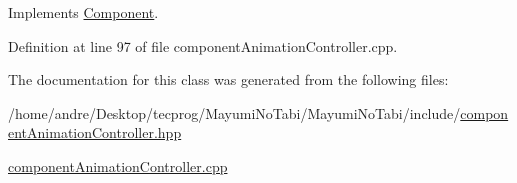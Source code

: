 Implements \hyperlink{class_component_a20c791684d452b36fcce40ac9038c735}{Component}.



Definition at line 97 of file component\-Animation\-Controller.\-cpp.



The documentation for this class was generated from the following files\-:\begin{DoxyCompactItemize}
\item 
/home/andre/\-Desktop/tecprog/\-Mayumi\-No\-Tabi/\-Mayumi\-No\-Tabi/include/\hyperlink{component_animation_controller_8hpp}{component\-Animation\-Controller.\-hpp}\item 
\hyperlink{component_animation_controller_8cpp}{component\-Animation\-Controller.\-cpp}\end{DoxyCompactItemize}
